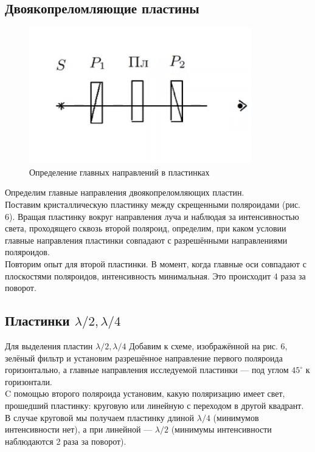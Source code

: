 \documentclass[a4paper]{article}
\begin{document}
\subsection{Двоякопреломляющие пластины}

\begin{figure}
\includegraphics[width=\linewidth]{7}
	\caption{Определение главных
		направлений в пластинках}
	\label{ris 7}
\end{figure}
Определим главные направления двоякопреломляющих пластин. \\
Поставим кристаллическую пластинку между скрещенными поляроидами (рис. 6). Вращая пластинку вокруг направления луча и наблюдая за интенсивностью света, проходящего сквозь второй поляроид, определим, при каком условии главные направления пластинки совпадают с разрешёнными направлениями поляроидов. \\
Повторим опыт для второй пластинки.
В момент, когда главные оси совпадают с плоскостями поляроидов, интенсивность минимальная. Это происходит 4 раза за поворот.\\
\subsection{Пластинки $ \lambda/2, \lambda/4 $}

Для выделения пластин $ \lambda/2, \lambda/4 $ Добавим к схеме, изображённой на рис. 6, зелёный фильтр и установим разрешённое направление первого поляроида горизонтально, а главные направления исследуемой пластинки --- под углом $ 45^\circ $ к горизонтали.\\
C помощью второго поляроида установим, какую поляризацию
имеет свет, прошедший пластинку: круговую или линейную с переходом
в другой квадрант. В случае круговой мы получаем пластинку длиной $ \lambda/4 $ (минимумов интенсивности нет), а при линейной --- $ \lambda/2 $ (минимумы интенсивности наблюдаются 2 раза за поворот).\\
\end{document}

